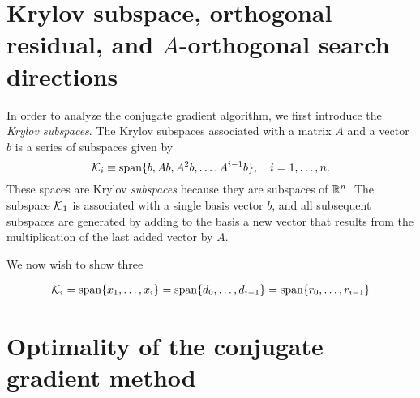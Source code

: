 \section{Krylov subspace, orthogonal residual, and $A$-orthogonal search directions}
In order to analyze the conjugate gradient algorithm, we first introduce the \emph{Krylov subspaces}.  The Krylov subspaces associated with a matrix $A$ and a vector $b$ is a series of subspaces given by
\begin{equation*}
  \mathcal{K}_i \equiv \text{span} \{ b, Ab, A^2 b, \dots, A^{i-1}b \}, \quad i = 1,\dots, n.
\end{equation*}
These spaces are Krylov \emph{subspaces} because they are subspaces of $\mathbb{R}^n$. The subspace $\mathcal{K}_1$ is associated with a single basis vector $b$, and all subsequent subspaces are generated by adding to the basis a new vector that results from the multiplication of the last added vector by $A$.

We now wish to show three 



\begin{align*}
  \mathcal{K}_i
  = \text{span}\{x_1,\dots,x_i\}
  = \text{span}\{ d_0,\dots,d_{i-1}\}
  = \text{span}\{r_0, \dots, r_{i-1} \}
\end{align*}



\section{Optimality of the conjugate gradient method}

